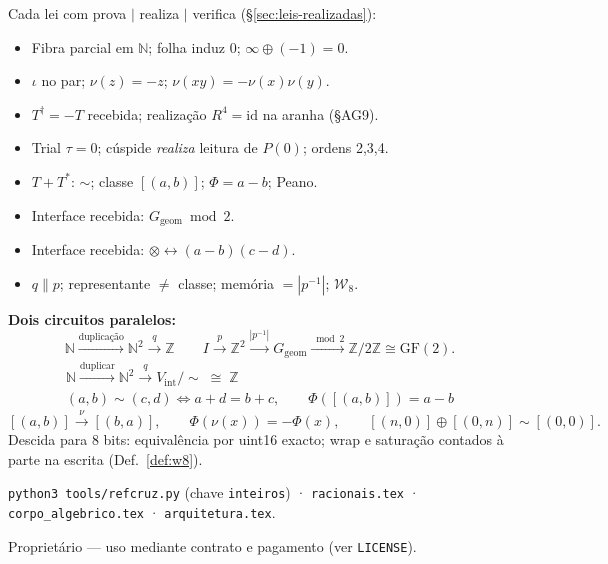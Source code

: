 \documentclass[11pt,a4paper]{article}
\newcommand{\code}[1]{\texttt{\small #1}}
\newcommand{\dg}{^{\dagger}}
\newcommand{\Word}{\mathcal{W}}
\begin{document}
\noindent Cada lei com prova $\mid$ realiza $\mid$ verifica
(§\ref{sec:leis-realizadas}):

\begin{itemize}\itemsep2pt
\item[\textbf{0}] Fibra parcial em $\mathbb{N}$; folha induz $0$; $\infty\oplus(-1)=0$.
\item[\textbf{1}] $\iota$ no par; $\nu(z)=-z$; $\nu(xy)=-\nu(x)\nu(y)$.
\item[\textbf{2}] $T\dg=-T$ recebida; realização $R^{4}=\mathrm{id}$ na aranha (§AG9).
\item[\textbf{3}] Trial $\tau=0$; cúspide \emph{realiza} leitura de $P(0)$; ordens 2,3,4.
\item[\textbf{4}] $T+T^{*}$: $\sim$; classe $[(a,b)]$; $\Phi=a-b$; Peano.
\item[\textbf{5}] Interface recebida: $G_{\mathrm{geom}}\bmod2$.
\item[\textbf{6}] Interface recebida: $\otimes\leftrightarrow(a-b)(c-d)$.
\item[\textbf{7}] $q\parallel p$; representante $\neq$ classe; memória $=|p^{-1}|$; $\Word_8$.
\end{itemize}

\medskip\noindent\textbf{Dois circuitos paralelos:}
\[
\mathbb{N}\xrightarrow{\text{duplicação}}\mathbb{N}^{2}
\xrightarrow{q}\mathbb{Z}
\qquad
I\xrightarrow{p}\mathbb{Z}^{2}
\xrightarrow{|p^{-1}|}G_{\mathrm{geom}}
\xrightarrow{\bmod 2}\mathbb{Z}/2\mathbb{Z}\cong\mathrm{GF}(2).
\]
\[
\boxed{
\begin{array}{c}
\mathbb{N}\xrightarrow{\text{duplicar}}\mathbb{N}^{2}
\xrightarrow{\;q\;} V_{\mathrm{int}}/{\sim}\;\cong\;\mathbb{Z}\\[2pt]
(a,b)\sim(c,d)\iff a+d=b+c,\qquad
\Phi([(a,b)])=a-b
\end{array}}
\]
\[
\boxed{
[(a,b)]\xrightarrow{\ \nu\ }[(b,a)],\qquad
\Phi(\nu(x))=-\Phi(x),\qquad
[(n,0)]\oplus[(0,n)]\sim[(0,0)].
}
\]
Descida para 8 bits: equivalência por uint16 exacto; wrap e saturação
contados à parte na escrita (Def.~\ref{def:w8}).

\medskip\noindent
\code{python3 tools/refcruz.py} (chave \code{inteiros}) ·
\code{racionais.tex} · \code{corpo\_algebrico.tex} · \code{arquitetura.tex}.

\vfill
{\footnotesize\color{cinza}\noindent Proprietário --- uso mediante contrato e pagamento (ver \texttt{LICENSE}).\par}
\end{document}
